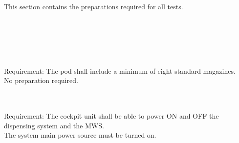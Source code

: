 This section contains the preparations required for all tests.

\mbox{}\\ %


\mbox{}\\ %


\mbox{}\\ %


\mbox{}\\ %

\mbox{}\\ %
Requirement: The pod shall include a minimum of eight standard magazines.\\
No preparation required.

\mbox{}\\ %

\mbox{}\\ %
Requirement: The cockpit unit shall be able to power ON and OFF the dispensing system and the MWS.\\
The system main power source must be turned on.

\mbox{}\\ %


\mbox{}\\ %


\mbox{}\\ %

\mbox{}\\ %


\mbox{}\\ %

\mbox{}\\ %


\mbox{}\\ %


\mbox{}\\ %


\mbox{}\\ %

\mbox{}\\ %


\mbox{}\\ %

